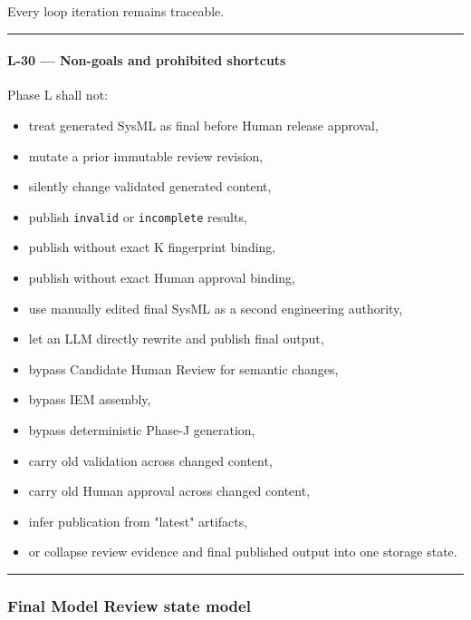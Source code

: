 Every loop iteration remains traceable.

\begin{center}\rule{0.5\linewidth}{0.5pt}\end{center}

\hypertarget{l-30--non-goals-and-prohibited-shortcuts}{%
\paragraph{L-30 --- Non-goals and prohibited shortcuts}\label{l-30--non-goals-and-prohibited-shortcuts}}

Phase L shall not:

\begin{itemize}
\tightlist
\item
  treat generated SysML as final before Human release approval,
\item
  mutate a prior immutable review revision,
\item
  silently change validated generated content,
\item
  publish \texttt{invalid} or \texttt{incomplete} results,
\item
  publish without exact K fingerprint binding,
\item
  publish without exact Human approval binding,
\item
  use manually edited final SysML as a second engineering authority,
\item
  let an LLM directly rewrite and publish final output,
\item
  bypass Candidate Human Review for semantic changes,
\item
  bypass IEM assembly,
\item
  bypass deterministic Phase-J generation,
\item
  carry old validation across changed content,
\item
  carry old Human approval across changed content,
\item
  infer publication from "latest" artifacts,
\item
  or collapse review evidence and final published output into one storage state.
\end{itemize}

\begin{center}\rule{0.5\linewidth}{0.5pt}\end{center}

\hypertarget{final-model-review-state-model}{%
\subsubsection{Final Model Review state model}\label{final-model-review-state-model}}

